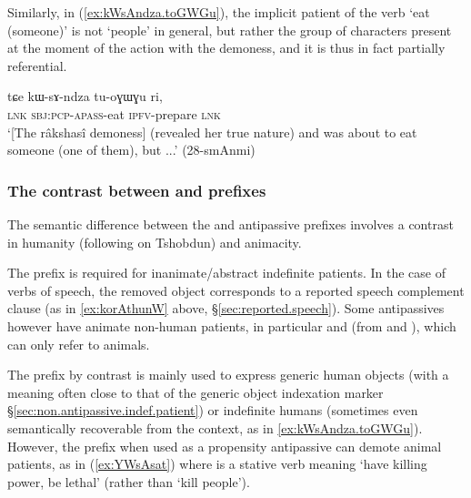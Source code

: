 Similarly, in (\ref{ex:kWsAndza.toGWGu}), the implicit patient of the verb  `eat (someone)' is not `people' in general, but rather the group of characters present at the moment of the action with the demoness, and it is thus in fact partially referential. 

\begin{exe}
\ex \label{ex:kWsAndza.toGWGu}  
\gll tɕe kɯ-sɤ-ndza tu-oɣɯɣu ri,\\
\textsc{lnk} \textsc{sbj}:\textsc{pcp}-\textsc{apass}-eat \textsc{ipfv}-prepare \textsc{lnk} \\
\glt `[The râkshasî demoness] (revealed her true nature) and was about to eat someone (one of them), but ...' (28-smAnmi) 
\end{exe}

  \subsubsection{The contrast between  and  prefixes  } \label{sec:antipassive.rA.sA}
The semantic difference between the   and  antipassive prefixes involves a contrast in humanity (following \citealt{jackson06paisheng} on Tshobdun) and animacity.

The   prefix is required for inanimate/abstract indefinite patients. In the case of verbs of speech, the removed object corresponds to a reported speech complement clause (as in \ref{ex:korAthunW} above, §\ref{sec:reported.speech}). Some  antipassives however have animate non-human patients, in particular   and   (from    and  ), which can only refer to animals. 

The  prefix by contrast is mainly used to express generic human objects (with a meaning often close to that of the generic object indexation marker  §\ref{sec:non.antipassive.indef.patient}) or indefinite humans (sometimes even semantically recoverable from the context, as in \ref{ex:kWsAndza.toGWGu}). However,  the  prefix when used as a propensity antipassive can demote animal patients, as in (\ref{ex:YWsAsat}) where  is a stative verb meaning `have killing power, be lethal' (rather than `kill people').  
 
